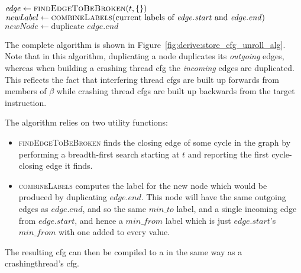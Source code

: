 \begin{sanefig}
\begin{algorithmic}[1]
       \State $\mathit{edge} \gets \textsc{findEdgeToBeBroken}(t, \{\})$
       \State $\mathit{newLabel} \gets \textsc{combineLabels}(\text{current labels of } \mathit{edge}.\mathit{start} \text{ and } \mathit{edge}.\mathit{end})$
       \Else
           \State $\mathit{newNode} \gets \text{duplicate } \mathit{edge}.\mathit{end}$
           \EndFor
       \EndIf
    \EndWhile
  \EndFor
\end{algorithmic}
\vspace{-6pt}
\caption{Loop unrolling algorithm for interfering thread CFGs.
  \textsc{findEdgeToBeBroken} and \textsc{combineLabels} are described
  in the text.}
\label{fig:derive:store_cfg_unroll_alg}
\end{sanefig}

The complete algorithm is shown in
Figure~\ref{fig:derive:store_cfg_unroll_alg}.  Note that in this
algorithm, duplicating a node duplicates its \emph{outgoing} edges,
whereas when building a crashing thread \gls{cfg} the \emph{incoming}
edges are duplicated.  This reflects the fact that interfering thread
\glspl{cfg} are built up forwards from members of $\beta$ while
crashing thread \glspl{cfg} are built up backwards from the target
instruction.

The algorithm relies on two utility functions:
\begin{itemize}
\item \textsc{findEdgeToBeBroken} finds the closing edge of some cycle
  in the graph by performing a breadth-first search starting at $t$
  and reporting the first cycle-closing edge it finds.
\item \textsc{combineLabels} computes the label for the new node which
  would be produced by duplicating $\mathit{edge}.\mathit{end}$.  This
  node will have the same outgoing edges as
  $\mathit{edge}.\mathit{end}$, and so the same $min\_to$ label, and a
  single incoming edge from $\mathit{edge}.\mathit{start}$, and hence
  a $\mathit{min\_from}$ label which is just
  $\mathit{edge}.\mathit{start}$'s $\mathit{min\_from}$ with one added
  to every value.
\end{itemize}
The resulting \gls{cfg} can then be compiled to a {\StateMachine} in
the same way as a \gls{crashingthread}'s \gls{cfg}.

